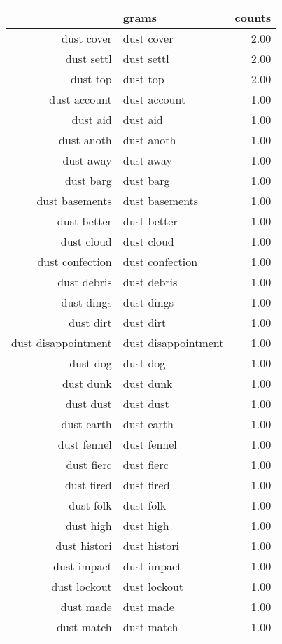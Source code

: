 \begin{table}[ht]
\centering
\begin{tabular}{rlr}
  \hline
 & grams & counts \\ 
  \hline
dust cover & dust cover & 2.00 \\ 
  dust settl & dust settl & 2.00 \\ 
  dust top & dust top & 2.00 \\ 
  dust account & dust account & 1.00 \\ 
  dust aid & dust aid & 1.00 \\ 
  dust anoth & dust anoth & 1.00 \\ 
  dust away & dust away & 1.00 \\ 
  dust barg & dust barg & 1.00 \\ 
  dust basements & dust basements & 1.00 \\ 
  dust better & dust better & 1.00 \\ 
  dust cloud & dust cloud & 1.00 \\ 
  dust confection & dust confection & 1.00 \\ 
  dust debris & dust debris & 1.00 \\ 
  dust dings & dust dings & 1.00 \\ 
  dust dirt & dust dirt & 1.00 \\ 
  dust disappointment & dust disappointment & 1.00 \\ 
  dust dog & dust dog & 1.00 \\ 
  dust dunk & dust dunk & 1.00 \\ 
  dust dust & dust dust & 1.00 \\ 
  dust earth & dust earth & 1.00 \\ 
  dust fennel & dust fennel & 1.00 \\ 
  dust fierc & dust fierc & 1.00 \\ 
  dust fired & dust fired & 1.00 \\ 
  dust folk & dust folk & 1.00 \\ 
  dust high & dust high & 1.00 \\ 
  dust histori & dust histori & 1.00 \\ 
  dust impact & dust impact & 1.00 \\ 
  dust lockout & dust lockout & 1.00 \\ 
  dust made & dust made & 1.00 \\ 
  dust match & dust match & 1.00 \\ 

\end{tabular}
\end{table}
